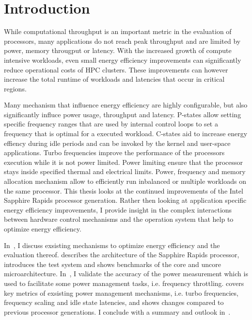 \chapter{Introduction}
\label{sec:introduction}

While computational throughput is an important metric in the evaluation of processors, many applications do not reach peak throughput and are limited by power, memory througput or latency.
With the increased growth of compute intensive workloads, even small energy efficiency improvements can significantly reduce operational costs of HPC clusters.
These improvements can however increase the total runtime of workloads and latencies that occur in critical regions.

Many mechanism that influence energy efficiency are highly configurable, but also significantly influce power usage, throughput and latency.
P-states allow setting specific frequency ranges that are used by internal control loops to set a frequency that is optimal for a executed workload.
C-states aid to increase energy effiency during idle periods and can be invoked by the kernel and user-space applications.
Turbo frequencies improve the performance of the processors execution while it is not power limited.
Power limiting ensure that the processor stays inside specified thermal and electrical limits.
Power, frequency and memory allocation mechanism allow to efficiently run inbalanced or multiple workloads on the same processor.
This thesis looks at the continued improvements of the Intel Sapphire Rapids processor generation.
Rather then looking at application specific energy efficiency improvements, I provide insight in the complex interactions between hardware control mechanisms and the operation system that help to optimize energy efficiency.

In~, I discuss exsisting mechanisms to optimize energy efficiency and the evaluation thereof.
 describes the architecture of the Sapphire Rapids processor, introduces the test system and shows benchmarks of the core and uncore microarchitecture.
In~, I validate the accuracy of the power measurement which is used to facilitate some power management tasks, i.e. frequency throttling.
 covers key metrics of exsisting power management mechanisms, i.e. turbo frequencies, frequency scaling and idle state latencies, and shows changes compared to previous processor generations.
I conclude with a summary and outlook in~.